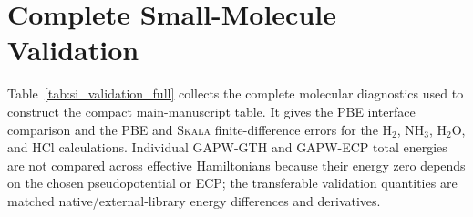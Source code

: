 \documentclass[10pt]{article}
\newcommand{\Skala}{\textsc{Skala}}
\newcommand{\GAPW}{\textsc{GAPW}}
\newcommand{\GTH}{\textsc{GTH}}
\newcommand{\GAPWGTH}{\GAPW{}-\GTH{}}
\newcommand{\GAPWECP}{\GAPW{}-ECP}
\begin{document}
\section{{Complete Small-Molecule Validation}}

\begingroup

Table~\ref{tab:si_validation_full} collects the complete molecular diagnostics used to construct the compact main-manuscript table.  It gives the PBE interface comparison and the PBE and \Skala{} finite-difference errors for the H$_2$, NH$_3$, H$_2$O, and HCl calculations.  Individual \GAPWGTH{} and \GAPWECP{} total energies are not compared across effective Hamiltonians because their energy zero depends on the chosen pseudopotential or ECP; the transferable validation quantities are matched native/external-library energy differences and derivatives.
\end{document}
